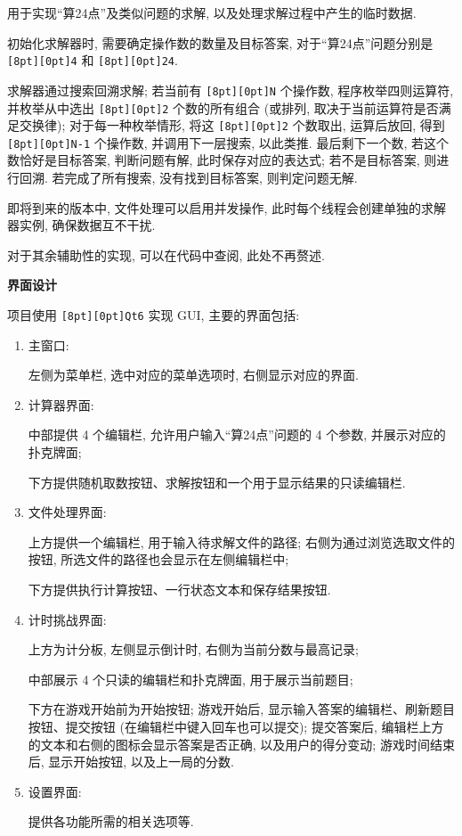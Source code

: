 \documentclass{ctexart}
\newcommand{\subtitletext}[1]{{\fontsize{16}{16} \textbf{#1} \vspace*{1ex}}}
\newcommand{\codebox}[1]{\colorbox[rgb]{0.9, 0.9, 0.9}{\texttt{\raisebox{0pt}[8pt][0pt]{#1}}}}
\begin{document}
\begin{enumerate}[itemindent=0pt, leftmargin=14pt]
    用于实现“算24点”及类似问题的求解, 以及处理求解过程中产生的临时数据.

    初始化求解器时, 需要确定操作数的数量及目标答案, 对于“算24点”问题分别是 \codebox{4} 和 \codebox{24}.

    求解器通过搜索回溯求解; 若当前有 \codebox{N} 个操作数, 程序枚举四则运算符, 
    并枚举从中选出 \codebox{2} 个数的所有组合 (或排列, 取决于当前运算符是否满足交换律);
    对于每一种枚举情形, 将这 \codebox{2} 个数取出, 运算后放回, 得到 \codebox{N-1} 个操作数,
    并调用下一层搜索, 以此类推. 最后剩下一个数, 若这个数恰好是目标答案, 判断问题有解, 此时保存对应的表达式; 若不是目标答案, 则进行回溯.
    若完成了所有搜索, 没有找到目标答案, 则判定问题无解.

    即将到来的版本中, 文件处理可以启用并发操作, 此时每个线程会创建单独的求解器实例, 确保数据互不干扰.
    
    
\end{enumerate}

对于其余辅助性的实现, 可以在代码中查阅, 此处不再赘述.

\vspace*{4ex}

\subtitletext{界面设计}

项目使用 \codebox{Qt6} 实现 GUI, 主要的界面包括:

\begin{enumerate}[itemindent=0pt, leftmargin=14pt]

    \item 主窗口:
    
    左侧为菜单栏, 选中对应的菜单选项时, 右侧显示对应的界面.

    \item 计算器界面:
    
    中部提供 4 个编辑栏, 允许用户输入“算24点”问题的 4 个参数, 并展示对应的扑克牌面;

    下方提供随机取数按钮、求解按钮和一个用于显示结果的只读编辑栏.

    \item 文件处理界面:
    
    上方提供一个编辑栏, 用于输入待求解文件的路径; 右侧为通过浏览选取文件的按钮, 所选文件的路径也会显示在左侧编辑栏中;

    下方提供执行计算按钮、一行状态文本和保存结果按钮.

    \item 计时挑战界面:
    
    上方为计分板, 左侧显示倒计时, 右侧为当前分数与最高记录;

    中部展示 4 个只读的编辑栏和扑克牌面, 用于展示当前题目;

    下方在游戏开始前为开始按钮;
    游戏开始后, 显示输入答案的编辑栏、刷新题目按钮、提交按钮 (在编辑栏中键入回车也可以提交);
    提交答案后, 编辑栏上方的文本和右侧的图标会显示答案是否正确, 以及用户的得分变动;
    游戏时间结束后, 显示开始按钮, 以及上一局的分数.

    \item 设置界面:
    
    提供各功能所需的相关选项等.
    
\end{enumerate}
\end{document}
